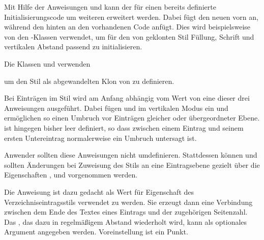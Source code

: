 Mit Hilfe der Anweisungen  und
 kann der für einen  bereits
definierte Initialisierungscode um weiteren 
erweitert werden. Dabei fügt  den neuen
 vorn an, während  den
 hinten an den vorhandenen Code anfügt. Dies wird
beispielsweise von den \KOMAScript-Klassen verwendet, um für den von
 geklonten Stil  Füllung, Schrift und vertikalen
Abstand passend zu initialisieren.
\begin{Example}
Die Klassen  und
 verwenden
\begin{lstcode}
  \TOCEntryStyleStartInitCode{section}{%
    \expandafter\providecommand%
    \csname scr@tso@#1@linefill\endcsname
    {\TOCLineLeaderFill\relax}%
  }
\end{lstcode}
um den Stil  als abgewandelten Klon von  zu
definieren.%
\end{Example}%
\EndIndexGroup
\ExampleEndFix


\begin{Declaration}
\end{Declaration}
Bei Einträgen im Stil
 wird am Anfang abhängig vom Wert von
 eine dieser drei Anweisungen
ausgeführt. Dabei fügen  und
 im vertikalen Modus
 ein und ermöglichen so
einen Umbruch vor Einträgen gleicher oder übergeordneter
Ebene.  ist hingegen bisher leer definiert, so
dass zwischen einem Eintrag und seinem ersten Untereintrag normalerweise ein
Umbruch untersagt ist.

Anwender sollten diese Anweisungen nicht umdefinieren. Stattdessen können und
sollten Änderungen bei Zuweisung des Stils an eine Eintragsebene gezielt über
die Eigenschaften ,  und
 vorgenommen werden.%
\EndIndexGroup


\begin{Declaration}
\end{Declaration}
Die Anweisung ist dazu gedacht
als Wert für Eigenschaft  des Verzeichniseintragsstils
 verwendet zu werden. Sie erzeugt dann eine Verbindung zwischen
dem Ende des Textes eines Eintrags und der zugehörigen Seitenzahl. Das
, das dazu in regelmäßigem Abstand wiederholt wird, kann
als optionales Argument angegeben werden. Voreinstellung ist ein
Punkt.

